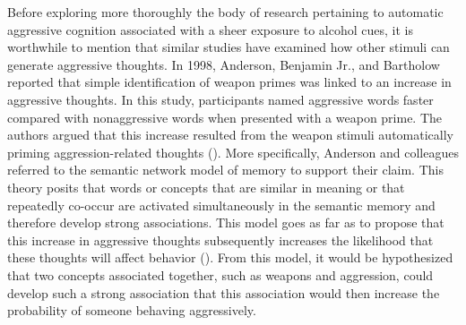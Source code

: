 \documentclass[serif, authordate, twocolumn, empirical]{jote-article}
\begin{document}
Before exploring more thoroughly the body of research pertaining to automatic aggressive cognition associated with a sheer exposure to alcohol cues, it is worthwhile to mention that similar studies have examined how other stimuli can generate aggressive thoughts. In 1998, Anderson, Benjamin Jr., and Bartholow reported that simple identification of weapon primes was linked to an increase in aggressive thoughts. In this study, participants named aggressive words faster compared with nonaggressive words when presented with a weapon prime. The authors argued that this increase resulted from the weapon stimuli automatically priming aggression-related thoughts (). More specifically, Anderson and colleagues referred to the semantic network model of memory to support their claim. This theory posits that words or concepts that are similar in meaning or that repeatedly co-occur are activated simultaneously in the semantic memory and therefore develop strong associations. This model goes as far as to propose that this increase in aggressive thoughts subsequently increases the likelihood that these thoughts will affect behavior (). From this model, it would be hypothesized that two concepts associated together, such as weapons and aggression, could develop such a strong association that this association would then increase the probability of someone behaving aggressively. 
\end{document}
